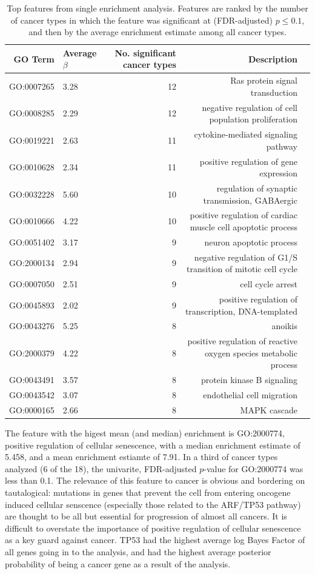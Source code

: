 \begin{table}[ht]
\centering
\begin{tabular}{rlrrl}
  \hline
  GO Term & Average $\beta$ & No. significant cancer types & Description \\ 
  \hline
GO:0007265 & 3.28 &  12 & Ras protein signal transduction \\ 
GO:0008285 & 2.29 &  12 & negative regulation of cell population proliferation \\ 
GO:0019221 & 2.63 &  11 & cytokine-mediated signaling pathway \\ 
GO:0010628 & 2.34 &  11 & positive regulation of gene expression \\ 
GO:0032228 & 5.60 &  10 & regulation of synaptic transmission, GABAergic \\ 
GO:0010666 & 4.22 &  10 & positive regulation of cardiac muscle cell apoptotic process \\ 
GO:0051402 & 3.17 &   9 & neuron apoptotic process \\ 
GO:2000134 & 2.94 &   9 & negative regulation of G1/S transition of mitotic cell cycle \\ 
GO:0007050 & 2.51 &   9 & cell cycle arrest \\ 
GO:0045893 & 2.02 &   9 & positive regulation of transcription, DNA-templated \\ 
GO:0043276 & 5.25 &   8 & anoikis \\ 
GO:2000379 & 4.22 &   8 & positive regulation of reactive oxygen species metabolic process \\ 
GO:0043491 & 3.57 &   8 & protein kinase B signaling \\ 
GO:0043542 & 3.07 &   8 & endothelial cell migration \\ 
GO:0000165 & 2.66 &   8 & MAPK cascade \\ 
\end{tabular}
\caption{Top features from single enrichment analysis.  Features are ranked by the number of cancer types in which the feature was significant at (FDR-adjusted) $p \leq 0.1$, and then by the average enrichment estimate among all cancer types.   }
\end{table}




The feature with the higest mean (and median) enrichment is GO:2000774, positive regulation of cellular senescence, with a median enrichment estimate of 5.458, and a mean enrichment estiamte of 7.91.  In a third of cancer types analyzed (6 of the 18), the univarite, FDR-adjusted $p$-value for GO:2000774 was less than 0.1.  The relevance of this feature to cancer is obvious and bordering on tautalogical: mutations in genes that prevent the cell from entering oncogene induced cellular senscence (especially those related to the ARF/TP53 pathway)  are thought to be all but essential for progression of almost all cancers\cite{chandeck10_oncog_induc_cellul_senes}.  It is difficult to overstate the importance of positive regulation of cellular senescence as a key guard against cancer.  TP53 had the highest average log Bayes Factor of all genes going in to the analysis, and had the highest average posterior probability of being a cancer gene as a result of the analysis.



